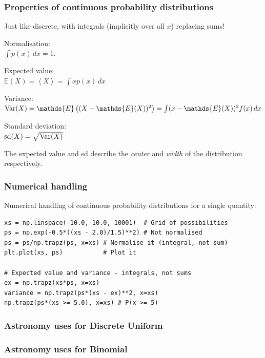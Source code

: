 \documentclass{beamer}
\begin{document}
\begin{frame}
\frametitle{Properties of continuous probability distributions}

Just like discrete, with integrals (implicitly over all $x$) replacing sums!

\pause
Normalisation:\\ $\int p(x) \, dx = 1$.\vspace{0.5em}

\pause
Expected value:\\$\mathds{E}(X) = \left<X\right> = \int x p(x) \, dx$\vspace{0.5em}

\pause
Variance:\\$\textnormal{Var}(X) = \mathds{E}\left((X - \mathds{E}(X))^2\right) = \int (x - \mathds{E}(X))^2 f(x) \, dx$\vspace{0.5em}

\pause
Standard deviation:\\$\textnormal{sd}(X) = \sqrt{\textnormal{Var}(X)}$

\pause
The expected value and sd describe the {\em center} and {\em width}
of the distribution respectively.

\end{frame}


\begin{frame}[t, fragile]
\frametitle{Numerical handling}
Numerical handling of continuous probability distributions for a single
quantity: \vspace{2em}

\begin{verbatim}
xs = np.linspace(-10.0, 10.0, 10001)  # Grid of possibilities
ps = np.exp(-0.5*((xs - 2.0)/1.5)**2) # Not normalised
ps = ps/np.trapz(ps, x=xs) # Normalise it (integral, not sum)
plt.plot(xs, ps)           # Plot it

# Expected value and variance - integrals, not sums
ex = np.trapz(xs*ps, x=xs) 
variance = np.trapz(ps*(xs - ex)**2, x=xs)
np.trapz(ps*(xs >= 5.0), x=xs) # P(x >= 5)
\end{verbatim}
\end{frame}


\begin{frame}[t, fragile]
\frametitle{Astronomy uses for Discrete Uniform}



\end{frame}


\begin{frame}[t, fragile]
\frametitle{Astronomy uses for Binomial}


\end{frame}
\end{document}
